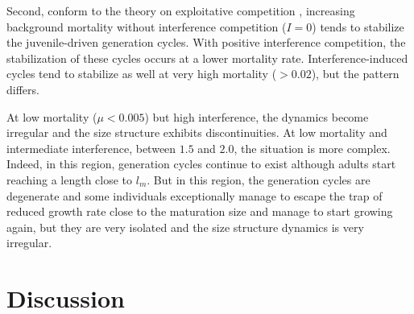 Second, conform to the theory on exploitative competition
\autocites{de-roos1997a}, increasing background mortality without interference
competition ($I = 0$) tends to stabilize the juvenile-driven generation cycles.
With positive interference competition, the stabilization of these cycles occurs
at a lower mortality rate.
Interference-induced cycles tend to stabilize as well at very high mortality
($>0.02$), but the pattern differs.

At low mortality ($\mu<0.005$) but high interference, the dynamics become
irregular and the size structure exhibits discontinuities. At low mortality and
intermediate interference, between $1.5$ and $2.0$, the situation is more
complex. Indeed, in this region, generation cycles continue to exist although
adults start reaching a length close to $l_m$. But in this region, the
generation cycles are degenerate and some individuals exceptionally manage to
escape the trap of reduced growth rate close to the maturation size and manage
to start growing again, but they are very isolated and the size structure
dynamics is very irregular.

\section{Discussion}

